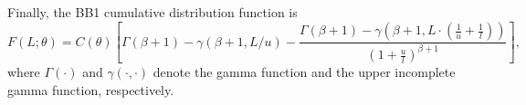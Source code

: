 \documentclass[12pt]{article}
\numberwithin{equation}{section}
\numberwithin{figure}{section}
\numberwithin{table}{section}
\newcommand{\lcdf}{F}
\begin{document}
Finally, the BB1 cumulative distribution function is 
\begin{equation}
\label{eq:lumCDF} 
\lcdf(L ; \theta) = 
  C(\theta)
  \left[ \Gamma(\beta + 1) - \gamma\left(\beta + 1, L/u\right) - \frac{\Gamma(\beta + 1)-\gamma\left(\beta + 1, L\cdot\left(\frac{1}{u}+\frac{1}{l}\right)\right)}{\left(1 + \frac{u}{l}\right)^{\beta + 1}} \right],
\end{equation}
where $\Gamma(\cdot)$ and $\gamma(\cdot, \cdot)$ denote the gamma function and the upper incomplete gamma function, respectively.





\end{document}

